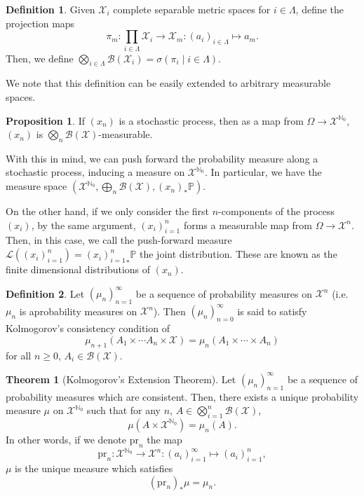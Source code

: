 \documentclass[]{article}
\theoremstyle{definition}
\newtheorem{theorem}{Theorem}
\theoremstyle{definition}
\newtheorem{definition}{Definition}[section]
\newtheorem{proposition}{Proposition}[section]
\begin{document}
\begin{definition}
  Given \(\mathcal{X}_i\) complete separable metric spaces for \(i \in \Lambda\), 
  define the projection maps 
  \[\pi_m : \prod_{i \in \Lambda} \mathcal{X}_i \to \mathcal{X}_m : (a_i)_{i \in \Lambda} \mapsto a_m.\]
  Then, we define 
  \(\bigotimes_{i \in \Lambda} \mathcal{B}(\mathcal{X}_i) = 
    \sigma(\pi_i \mid i \in \Lambda).\)

  We note that this definition can be easily extended to arbitrary measurable 
  spaces.
\end{definition}

\begin{proposition}
  If \((x_n)\) is a stochastic process, then as a map from \(\Omega \to \mathcal{X}^{\mathbb{N}_0}\),
  \((x_n)\) is \(\bigotimes_{n} \mathcal{B}(\mathcal{X})\)-measurable.
\end{proposition}

With this in mind, we can push forward the probability measure along a stochastic 
process, inducing a measure on \(\mathcal{X}^{\mathbb{N}_0}\). In particular, 
we have the measure space \((\mathcal{X}^{\mathbb{N}_0}, 
\bigoplus_n \mathcal{B}(\mathcal{X}), (x_n)_* \mathbb{P})\).

On the other hand, if we only consider the first \(n\)-components of the 
process \((x_i)\), by the same argument, \((x_i)_{i = 1}^n\) forms a measurable 
map from \(\Omega \to \mathcal{X}^{n}\). Then, in this case, we call the 
push-forward measure \(\mathcal{L}((x_i)_{i = 1}^n) = {(x_i)_{i = 1}^n}_* \mathbb{P}\) 
the joint distribution. These are known as the finite dimensional 
distributions of \((x_n)\).

\begin{definition}
  Let \((\mu_n)_{n = 1}^\infty\) be a sequence of probability measures on 
  \(\mathcal{X}^n\) (i.e. \(\mu_n\) is aprobability measures on \(\mathcal{X}^n\)). 
  Then \((\mu_n)_{n = 0}^\infty\) is said to satisfy Kolmogorov's consistency 
  condition of 
  \[\mu_{n + 1}(A_1 \times \cdots A_n \times \mathcal{X}) = 
    \mu_n(A_1 \times \cdots \times A_n)\]
  for all \(n \ge 0\), \(A_i \in \mathcal{B}(\mathcal{X})\).
\end{definition}

\begin{theorem}[Kolmogorov's Extension Theorem]
  Let \((\mu_n)_{n = 1}^\infty\) be a sequence of probability measures which are 
  consistent. Then, there exists a unique probability measure \(\mu\) on 
  \(\mathcal{X}^{\mathbb{N}_0}\) such that for any \(n\), 
  \(A \in \bigotimes_{i = 1}^n \mathcal{B}(\mathcal{X})\), 
  \[\mu(A \times \mathcal{X}^{\mathbb{N}_0}) = \mu_n(A).\]
  In other words, if we denote \(\text{pr}_n\) the map 
  \[\text{pr}_n : \mathcal{X}^{\mathbb{N}_0} \to \mathcal{X}^n : 
    (a_i)_{i = 1}^\infty \mapsto (a_i)_{i = 1}^n,\]
  \(\mu\) is the unique measure which satisfies 
  \[(\text{pr}_n)_* \mu = \mu_n.\]
\end{theorem}
\end{document}
